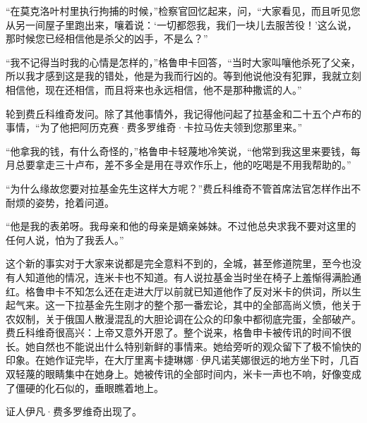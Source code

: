 \par “在莫克洛叶村里执行拘捕的时候，”检察官回忆起来，问，“大家看见，而且听见您从另一间屋子里跑出来，嚷着说：‘一切都怨我，我们一块儿去服苦役！’这么说，那时候您已经相信他是杀父的凶手，不是么？”
\par “我不记得当时我的心情是怎样的，”格鲁申卡回答，“当时大家叫嚷他杀死了父亲，所以我才感到这是我的错处，他是为我而行凶的。等到他说他没有犯罪，我就立刻相信他，现在还相信，而且将来也永远相信，他不是那种撒谎的人。”
\par 轮到费丘科维奇发问。除了其他事情外，我记得他问起了拉基金和二十五个卢布的事情，“为了他把阿历克赛·费多罗维奇·卡拉马佐夫领到您那里来。”
\par “他拿我的钱，有什么奇怪的，”格鲁申卡轻蔑地冷笑说，“他常到我这里来要钱，每月总要拿走三十卢布，差不多全是用在寻欢作乐上，他的吃喝是不用我帮助的。”
\par “为什么缘故您要对拉基金先生这样大方呢？”费丘科维奇不管首席法官怎样作出不耐烦的姿势，抢着问道。
\par “他是我的表弟呀。我母亲和他的母亲是嫡亲姊妹。不过他总央求我不要对这里的任何人说，怕为了我丢人。”
\par 这个新的事实对于大家来说都是完全意料不到的，全城，甚至修道院里，至今也没有人知道他的情况，连米卡也不知道。有人说拉基金当时坐在椅子上羞惭得满脸通红。格鲁申卡不知怎么还在走进大厅以前就已知道他作了反对米卡的供词，所以生起气来。这一下拉基金先生刚才的整个那一番宏论，其中的全部高尚义愤，他关于农奴制，关于俄国人散漫混乱的大胆论调在公众的印象中都彻底完蛋，全部破产。费丘科维奇很高兴：上帝又意外开恩了。整个说来，格鲁申卡被传讯的时间不很长。她自然也不能说出什么特别新鲜的事情来。她给旁听的观众留下了极不愉快的印象。在她作证完毕，在大厅里离卡捷琳娜·伊凡诺芙娜很远的地方坐下时，几百双轻蔑的眼睛集中在她身上。她被传讯的全部时间内，米卡一声也不响，好像变成了僵硬的化石似的，垂眼瞧着地上。
\par 证人伊凡·费多罗维奇出现了。
